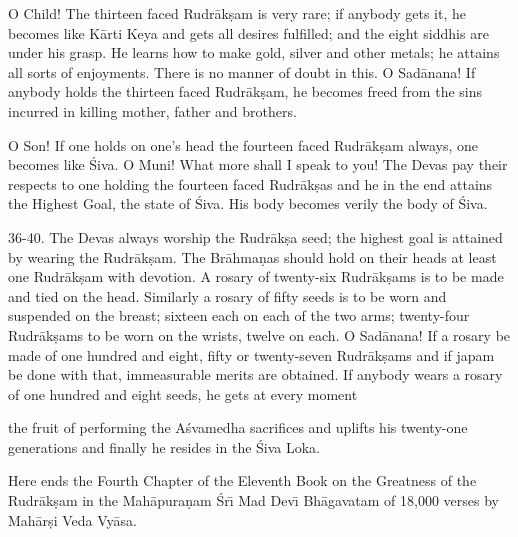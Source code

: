 O Child! The thirteen faced Rudr\=ak\d{s}am is very rare; if anybody gets it, he becomes like K\=arti Keya and gets all desires fulfilled; and the eight siddhis are under his grasp. He learns how to make gold, silver and other metals; he attains all sorts of enjoyments. There is no manner of doubt in this. O Sad\=anana! If anybody holds the thirteen faced Rudr\=ak\d{s}am, he becomes freed from the sins incurred in killing mother, father and brothers.

O Son! If one holds on one's head the fourteen faced Rudr\=ak\d{s}am always, one becomes like \'Siva. O Muni! What more shall I speak to you! The Devas pay their respects to one holding the fourteen faced Rudr\=ak\d{s}as and he in the end attains the Highest Goal, the state of \'Siva. His body becomes verily the body of \'Siva.

36-40. The Devas always worship the Rudr\=ak\d{s}a seed; the highest goal is attained by wearing the Rudr\=ak\d{s}am. The Br\=ahma\d{n}as should hold on their heads at least one Rudr\=ak\d{s}am with devotion. A rosary of twenty-six Rudr\=ak\d{s}ams is to be made and tied on the head. Similarly a rosary of fifty seeds is to be worn and suspended on the breast; sixteen each on each of the two arms; twenty-four Rudr\=ak\d{s}ams to be worn on the wrists, twelve on each. O Sad\=anana! If a rosary be made of one hundred and eight, fifty or twenty-seven Rudr\=ak\d{s}ams and if japam be done with that, immeasurable merits are obtained. If anybody wears a rosary of one hundred and eight seeds, he gets at every moment

the fruit of performing the A\'svamedha sacrifices and uplifts his twenty-one generations and finally he resides in the \'Siva Loka.

Here ends the Fourth Chapter of the Eleventh Book on the Greatness of the Rudr\=ak\d{s}am in the Mah\=apura\d{n}am \'Sr\={\i} Mad Dev\={\i} Bh\=agavatam of 18,000 verses by Mah\=ar\d{s}i Veda Vy\=asa.



